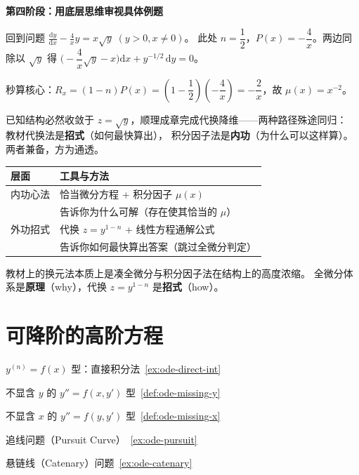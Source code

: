 \documentclass[lang=cn,11pt]{elegantbook}
\begin{document}
\begin{solution}
\textbf{第四阶段：用底层思维审视具体例题}

回到问题 $\displaystyle\frac{\mathrm{d}y}{\mathrm{d}x}-\frac{4}{x}y=x\sqrt{y}\;(y>0,x\neq 0)$。
此处 $n=\dfrac12$，$P(x)=-\dfrac{4}{x}$。两边同除以 $\sqrt{y}$ 得
$\bigg(-\dfrac{4}{x}\sqrt{y}-x\bigg)\mathrm{d}x+y^{-1/2}\,\mathrm{d}y=0$。

秒算核心：$R_x=(1-n)P(x)=\left(1-\dfrac12\right)\!\left(-\dfrac{4}{x}\right)
=-\dfrac{2}{x}$，故 $\mu(x)=x^{-2}$。

已知结构必然收敛于 $z=\sqrt{y}$，顺理成章完成代换降维——两种路径殊途同归：
教材代换法是\textbf{招式}（如何最快算出），
积分因子法是\textbf{内功}（为什么可以这样算）。
两者兼备，方为通透。
\end{solution}

\begin{conclusion}[总结：内功与外功]
\begin{center}
\begin{tabular}{@{}p{8cm}p{7cm}@{}}
\toprule
\textbf{层面} & \textbf{工具与方法} \\
\midrule
内功心法 & 恰当微分方程 + 积分因子 $\mu(x)$ \\
& 告诉你为什么可解（存在使其恰当的 $\mu$） \\
\midrule
外功招式 & 代换 $z=y^{1-n}$ + 线性方程通解公式 \\
& 告诉你如何最快算出答案（跳过全微分判定） \\
\bottomrule
\end{tabular}
\end{center}
教材上的换元法本质上是凑全微分与积分因子法在结构上的高度浓缩。
全微分体系是\textbf{原理}（why），代换 $z=y^{1-n}$ 是\textbf{招式}（how）。
\end{conclusion}

\section{可降阶的高阶方程}

\begin{introduction}
  \item $y^{(n)}=f(x)$ 型：直接积分法~\ref{ex:ode-direct-int}
  \item 不显含 $y$ 的 $y''=f(x,y')$ 型~\ref{def:ode-missing-y}
  \item 不显含 $x$ 的 $y''=f(y,y')$ 型~\ref{def:ode-missing-x}
  \item 追线问题（Pursuit Curve）~\ref{ex:ode-pursuit}
  \item 悬链线（Catenary）问题~\ref{ex:ode-catenary}
\end{introduction}
\end{document}
